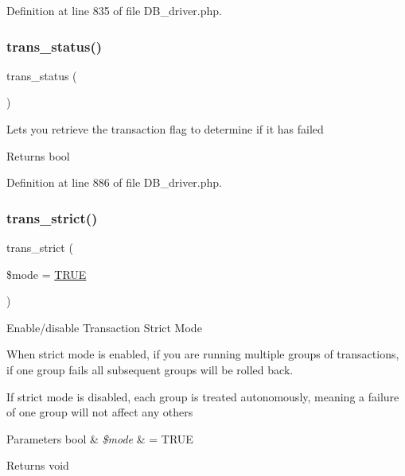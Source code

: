 Definition at line 835 of file D\+B\+\_\+driver.\+php.

\mbox{\label{class_c_i___d_b__driver_a7ce49452153f13afde8f9c5212028be6}} 
\subsubsection{\texorpdfstring{trans\_status()}{trans\_status()}}
{\footnotesize\ttfamily trans\+\_\+status (\begin{DoxyParamCaption}{ }\end{DoxyParamCaption})}

Lets you retrieve the transaction flag to determine if it has failed

\begin{DoxyReturn}{Returns}
bool 
\end{DoxyReturn}


Definition at line 886 of file D\+B\+\_\+driver.\+php.

\mbox{\label{class_c_i___d_b__driver_a648f8e6b3d0c53ce2afd63cfcea1fe74}} 
\subsubsection{\texorpdfstring{trans\_strict()}{trans\_strict()}}
{\footnotesize\ttfamily trans\+\_\+strict (\begin{DoxyParamCaption}\item[{}]{\$mode = {\ttfamily \mbox{\hyperlink{constants_8php_ae04a3efe6aa42044f803ee90c2277846}{T\+R\+UE}}} }\end{DoxyParamCaption})}

Enable/disable Transaction Strict Mode

When strict mode is enabled, if you are running multiple groups of transactions, if one group fails all subsequent groups will be rolled back.

If strict mode is disabled, each group is treated autonomously, meaning a failure of one group will not affect any others


\begin{DoxyParams}[1]{Parameters}
bool & {\em \$mode} & = T\+R\+UE \\
\hline
\end{DoxyParams}
\begin{DoxyReturn}{Returns}
void 
\end{DoxyReturn}


